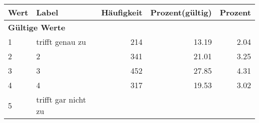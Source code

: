      \begin{longtable}{lXrrr}
     \toprule
     \textbf{Wert} & \textbf{Label} & \textbf{Häufigkeit} & \textbf{Prozent(gültig)} & \textbf{Prozent} \\
     \endhead
     \midrule
     \multicolumn{5}{l}{\textbf{Gültige Werte}}\\

     1 &
     \multicolumn{1}{X}{ trifft genau zu   } &


       \num{214} &
       \num[round-mode=places,round-precision=2]{13,19} &
         \num[round-mode=places,round-precision=2]{2,04} \\

     2 &
     \multicolumn{1}{X}{ 2   } &


       \num{341} &
       \num[round-mode=places,round-precision=2]{21,01} &
         \num[round-mode=places,round-precision=2]{3,25} \\

     3 &
     \multicolumn{1}{X}{ 3   } &


       \num{452} &
       \num[round-mode=places,round-precision=2]{27,85} &
         \num[round-mode=places,round-precision=2]{4,31} \\

     4 &
     \multicolumn{1}{X}{ 4   } &


       \num{317} &
       \num[round-mode=places,round-precision=2]{19,53} &
         \num[round-mode=places,round-precision=2]{3,02} \\

     5 &
     \multicolumn{1}{X}{ trifft gar nicht zu   } &



\end{longtable}
